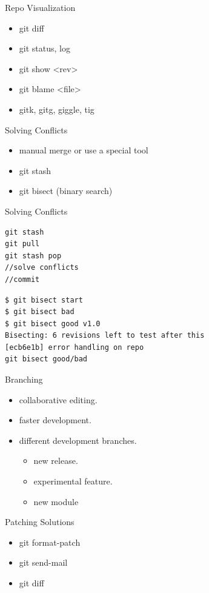 \documentclass{workshop}
\begin{document}
\begin{frame}{Repo Visualization}
\begin{itemize}
\item git diff
\item git status, log
\item git show <rev>
\item git blame <file>
\item gitk, gitg, giggle, tig
\end{itemize}
\end{frame}

\begin{frame}{Solving Conflicts}
\begin{itemize}
\item manual merge or use a special tool
\item git stash
\item git bisect (binary search)
\end{itemize}
\end{frame}

\begin{frame}[fragile]{Solving Conflicts}
\begin{verbatim}
git stash
git pull
git stash pop
//solve conflicts
//commit
\end{verbatim}
\begin{verbatim}
$ git bisect start
$ git bisect bad
$ git bisect good v1.0
Bisecting: 6 revisions left to test after this
[ecb6e1b] error handling on repo
git bisect good/bad
\end{verbatim}
\end{frame}

\begin{frame}{Branching}
\begin{itemize}
\item collaborative editing.
\item faster development.
\item different development branches.
\begin{itemize}
\item new release.
\item experimental feature.
\item new module
\end{itemize}
\end{itemize}
\end{frame}

\begin{frame}{Patching Solutions}
\begin{itemize}
\item git format-patch
\item git send-mail
\item git diff
\end{itemize}
\end{frame}
\end{document}
